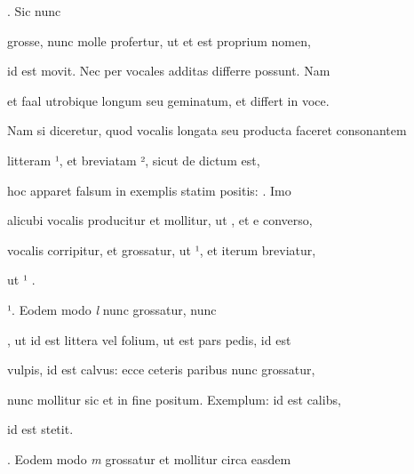 \indentP {}. Sic  nunc

\fulllines

grosse, nunc molle profertur, ut  et est proprium nomen, 

id est movit. Nec per vocales additas differre possunt. Nam 

et faal utrobique  longum seu geminatum, et  differt in voce.

Nam si diceretur, quod vocalis longata seu producta faceret consonantem



litteram ¹, et breviatam ², sicut de  dictum est,

hoc apparet falsum in exemplis statim positis:  . Imo

alicubi vocalis producitur et  mollitur, ut , et e converso,

vocalis corripitur, et  grossatur, ut ¹, et iterum  breviatur,


\splitlines

ut ¹   .


\indentK {}¹. Eodem modo \textit{l} nunc grossatur, nunc 

\fulllines

, ut  id est littera vel folium,  ut est pars pedis,  id est

vulpis,   id est calvus: ecce ceteris paribus nunc grossatur,

nunc mollitur sic et in fine positum. Exemplum:  id est calibs,

\splitlines

 id est stetit.

\indentK {}. Eodem modo \textit{m} grossatur et mollitur circa easdem

